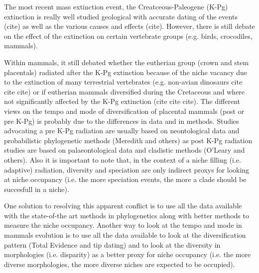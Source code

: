 \documentclass[12pt,letterpaper]{article}
\begin{document}
The most recent mass extinction event, the Creatceous-Paleogene (K-Pg) extinction is really well studied geological with accurate dating of the events (cite) as well as the various causes and effects (cite).
However, there is still debate on the effect of the extinction on certain vertebrate groups (e.g. birds, crocodiles, mammals).

Within mammals, it still debated whether the eutherian group (crown and stem placentals) radiated after the K-Pg extinction because of the niche vacancy due to the extinction of many terrestrial vertebrates (e.g. non-avian dinosaurs cite cite cite) or if eutherian mammals diversified during the Cretaceous and where not significantly affected by the K-Pg extinction (cite cite cite).
The different views on the tempo and mode of diversification of placental mammals (post or pre K-Pg) is probably due to the differences in data and in methods. Studies advocating a pre K-Pg radiation are usually based on neontological data and probabilistic phylogenetic methods (Meredith and others) as post K-Pg radiation studies are based on palaeontological data and cladistic methods (O'Leary and others). Also it is important to note that, in the context of a niche filling (i.e. adaptive) radiation, diversity and speciation are only indirect proxys for looking at niche occupancy (i.e. the more speciation events, the more a clade should be succesfull in a niche).

One solution to resolving this apparent conflict is to use all the data available with the state-of-the art methods in phylogenetics along with better methods to measure the niche occupancy.
Another way to look at the tempo and mode in mammals evolution is to use all the data available to look at the diversification pattern (Total Evidence and tip dating) and to look at the diversity in morphologies (i.e. disparity) as a better proxy for niche occupancy (i.e. the more diverse morphologies, the more diverse niches are expected to be occupied).
\end{document}
